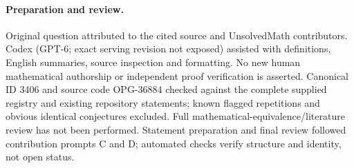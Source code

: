 \documentclass[11pt]{article}
\begin{document}
\paragraph{Preparation and review.}
Original question attributed to the cited source and UnsolvedMath contributors. Codex (GPT-6; exact serving revision not exposed) assisted with definitions, English summaries, source inspection and formatting. No new human mathematical authorship or independent proof verification is asserted. Canonical ID 3406 and source code OPG-36884 checked against the complete supplied registry and existing repository statements; known flagged repetitions and obvious identical conjectures excluded. Full mathematical-equivalence/literature review has not been performed. Statement preparation and final review followed contribution prompts C and D; automated checks verify structure and identity, not open status.
\label{end:3406}
\end{document}
